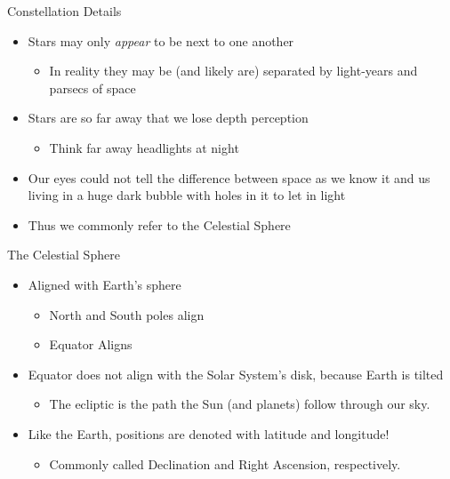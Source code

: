 \documentclass[pdf, aspectratio=169]{beamer}
\begin{document}
\begin{frame}{Constellation Details}
  \begin{itemize}
	\item Stars may only \emph{appear} to be next to one another
	  \begin{itemize}
		\item In reality they may be (and likely are) separated by light-years and parsecs of space
	  \end{itemize}
	\item Stars are so far away that we lose depth perception
	  \begin{itemize}
		\item Think far away headlights at night
	  \end{itemize}
	\item Our eyes could not tell the difference between space as we know it and us living in a huge dark bubble with holes in it to let in light
	\item Thus we commonly refer to the \alert{Celestial Sphere}
  \end{itemize}
\end{frame}

\begin{frame}{The Celestial Sphere}
  \begin{itemize}
	\item Aligned with Earth's sphere
	  \begin{itemize}
		\item North and South poles align
		\item Equator Aligns
	  \end{itemize}
	\item Equator does \alert{not} align with the Solar System's disk, because Earth is tilted
	  \begin{itemize}
		\item The \alert{ecliptic} is the path the Sun (and planets) follow through our sky.
	  \end{itemize}
	\item Like the Earth, positions are denoted with latitude and longitude!
	  \begin{itemize}
		\item Commonly called Declination and Right Ascension, respectively.
	  \end{itemize}
  \end{itemize}
\end{frame}
\end{document}

